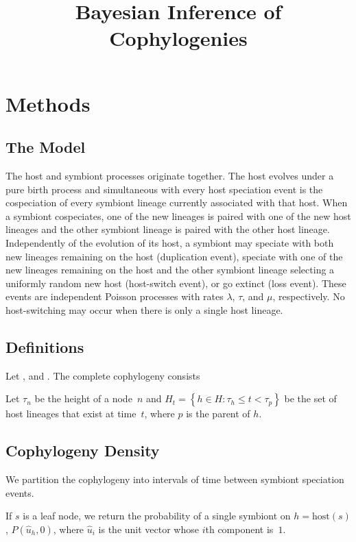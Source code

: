 \documentclass{article}
\title{Bayesian Inference of Cophylogenies}
\begin{document}
    \section*{Methods}

        \subsection*{The Model}

            The host and symbiont processes originate together. The host
            evolves under a pure birth process and simultaneous with every host
            speciation event is the cospeciation of every symbiont lineage
            currently associated with that host. When a symbiont cospeciates,
            one of the new lineages is paired with one of the new host lineages
            and the other symbiont lineage is paired with the other host
            lineage. Independently of the evolution of its host, a symbiont may
            speciate with both new lineages remaining on the host (duplication
            event), speciate with one of the new lineages remaining on the host
            and the other symbiont lineage selecting a uniformly random new
            host (host-switch event), or go extinct (loss event). These events
            are independent Poisson processes with rates $\lambda$, $\tau$, and
            $\mu$, respectively. No host-switching may occur when there is only
            a single host lineage.

        \subsection*{Definitions}

            Let , and . The complete cophylogeny consists

            Let $\tau_n$ be the height of a node~$n$ and $H_t = \left\{h \in H:
            \tau_h \leq t < \tau_p\right\}$ be the set of host lineages that exist
            at time~$t$, where $p$ is the parent of $h$.

        \subsection*{Cophylogeny Density}

            We partition the cophylogeny into intervals of time between
            symbiont speciation events.

            If $s$ is a leaf node, we return the probability of a single
            symbiont on $h = \text{host}\left(s\right)$, $P\left(\hat{u}_h,
            0\right)$, where $\hat{u}_i$ is the unit vector whose $i$th
            component is~$1$.
\end{document}
